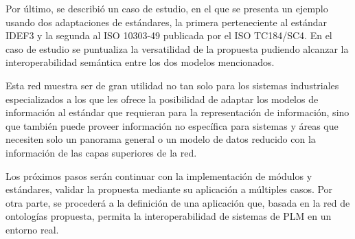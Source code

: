 \documentclass[journal]{IEEEtran}
\begin{document}
Por \'ultimo, se describi\'o un caso de estudio, en el que se presenta un ejemplo usando dos adaptaciones de est\'andares, la primera perteneciente al est\'andar IDEF3 y la segunda al ISO 10303-49 publicada por el ISO TC184/SC4. En el caso de estudio se puntualiza la versatilidad de la propuesta pudiendo alcanzar la interoperabilidad sem\'antica entre los dos modelos mencionados. 

Esta red muestra ser de gran utilidad no tan solo para los sistemas industriales especializados a los que les ofrece la posibilidad de adaptar los modelos de informaci\'on al est\'andar que requieran para la representaci\'on de informaci\'on, sino que tambi\'en puede proveer informaci\'on no espec\'ifica para sistemas y \'areas que necesiten solo un panorama general o un modelo de datos reducido con la informaci\'on de las capas superiores de la red. 

Los pr\'oximos pasos ser\'an continuar con la implementaci\'on de m\'odulos y est\'andares, validar la propuesta mediante su aplicaci\'on a m\'ultiples casos. Por otra parte, se proceder\'a a la definici\'on de una aplicaci\'on que, basada en la red de ontolog\'ias propuesta, permita la interoperabilidad de sistemas de PLM en un entorno real.







%
\end{document}
